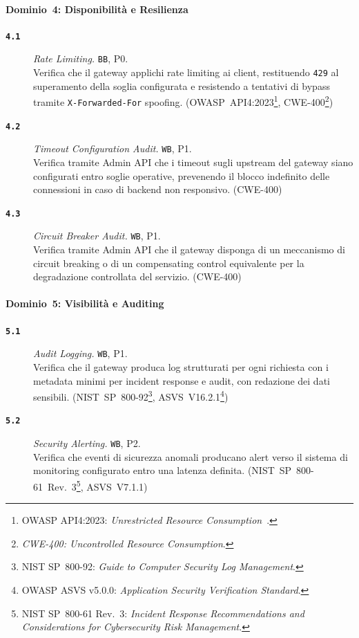 \paragraph{Dominio~4: Disponibilità e Resilienza}
\begin{description}
      \item[\textbf{\texttt{4.1}}]
            \textit{Rate Limiting.} \texttt{BB}, P0.\\
            Verifica che il gateway applichi rate limiting ai client, restituendo \texttt{429} al superamento della soglia configurata e resistendo a tentativi di bypass tramite \texttt{X-Forwarded-For} spoofing.
            (\gls{OWASP}~API4:2023\footnote{\gls{OWASP} API4:2023: \textit{Unrestricted Resource Consumption}~\cite{OWASPTop10}.}, \gls{CWE}-400\footnote{\textit{CWE-400: Uncontrolled Resource Consumption}.})

      \item[\textbf{\texttt{4.2}}]
            \textit{Timeout Configuration Audit.} \texttt{WB}, P1.\\
            Verifica tramite Admin \gls{API} che i timeout sugli upstream del gateway siano configurati entro soglie operative, prevenendo il blocco indefinito delle connessioni in caso di backend non responsivo.
            (\gls{CWE}-400)

      \item[\textbf{\texttt{4.3}}]
            \textit{Circuit Breaker Audit.} \texttt{WB}, P1.\\
            Verifica tramite Admin \gls{API} che il gateway disponga di un meccanismo di circuit breaking o di un compensating control equivalente per la degradazione controllata del servizio.
            (\gls{CWE}-400)
\end{description}

\paragraph{Dominio~5: Visibilità e Auditing}
\begin{description}
      \item[\textbf{\texttt{5.1}}]
            \textit{Audit Logging.} \texttt{WB}, P1.\\
            Verifica che il gateway produca log strutturati per ogni richiesta con i metadata minimi per incident response e audit, con redazione dei dati sensibili.
            (\gls{NIST}~SP~800-92\footnote{\gls{NIST} SP~800-92: \textit{Guide to Computer Security Log Management}.}, \gls{ASVS}~V16.2.1\footnote{\gls{OWASP} \gls{ASVS} v5.0.0: \textit{Application Security Verification Standard}.})

      \item[\textbf{\texttt{5.2}}]
            \textit{Security Alerting.} \texttt{WB}, P2.\\
            Verifica che eventi di sicurezza anomali producano alert verso il sistema di monitoring configurato entro una latenza definita.
            (\gls{NIST}~SP~800-61~Rev.~3\footnote{\gls{NIST} SP~800-61 Rev.~3: \textit{Incident Response Recommendations and Considerations for Cybersecurity Risk Management}.}, \gls{ASVS}~V7.1.1)
\end{description}

